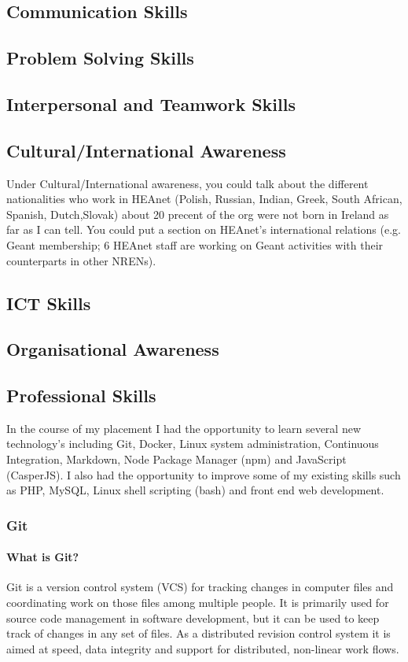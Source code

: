 \documentclass{article}
\begin{document}
\subsection{Communication Skills}
\subsection{Problem Solving Skills}
\subsection{Interpersonal and Teamwork Skills}
\subsection{Cultural/International Awareness}
Under Cultural/International awareness, you could talk about the different nationalities who work in HEAnet (Polish, Russian, Indian, Greek, South African, Spanish, Dutch,Slovak) about 20 precent of the org were not born in Ireland as far as I can tell. You could put a section on HEAnet's international relations (e.g. Geant membership;  6 HEAnet staff are working on Geant activities with their counterparts in other NRENs). 
\subsection{ICT Skills}
\subsection{Organisational Awareness}
\subsection{Professional Skills}
In the course of my placement I had the opportunity to learn several new technology's including Git, Docker, Linux system administration, Continuous Integration, Markdown, Node Package Manager (npm) and JavaScript (CasperJS).
I also had the opportunity to improve some of my existing skills such as PHP, MySQL, Linux shell scripting (bash) and front end web development.
\subsubsection{Git}
\paragraph{What is Git?}
Git is a version control system (VCS) for tracking changes in computer files and coordinating work on those files among multiple people. It is primarily used for source code management in software development, but it can be used to keep track of changes in any set of files. As a distributed revision control system it is aimed at speed, data integrity and support for distributed, non-linear work flows.
\end{document}
